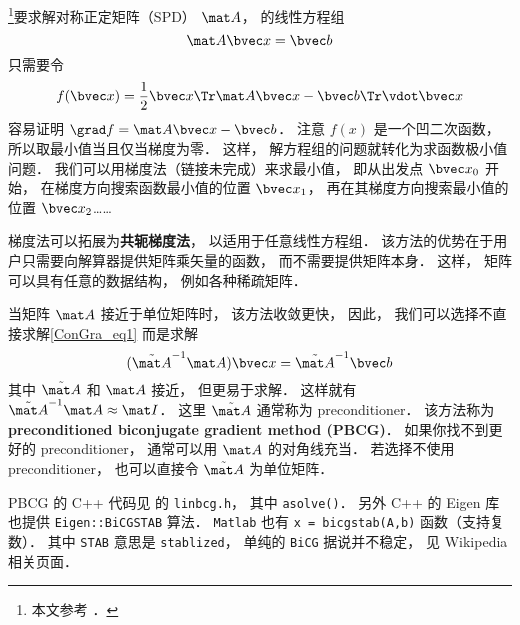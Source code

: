 
\begin{issues}
\issueDraft
\end{issues}


\footnote{本文参考 \cite{NR3}．}要求解对称正定矩阵（SPD） $\mat A$， 的线性方程组
\begin{equation}\label{ConGra_eq1}
\mat A \bvec x = \bvec b
\end{equation}
只需要令
\begin{equation}
f(\bvec x) = \frac{1}{2}\bvec x\Tr \mat A\bvec x - \bvec b\Tr \vdot \bvec x
\end{equation}
容易证明 $\grad f = \mat A \bvec x - \bvec b$． 注意 $f(x)$ 是一个凹二次函数， 所以取最小值当且仅当梯度为零． 这样， 解方程组的问题就转化为求函数极小值问题． 我们可以用梯度法（链接未完成）来求最小值， 即从出发点 $\bvec x_0$ 开始， 在梯度方向搜索函数最小值的位置 $\bvec x_1$， 再在其梯度方向搜索最小值的位置 $\bvec x_2$……

梯度法可以拓展为\textbf{共轭梯度法}， 以适用于任意线性方程组． 该方法的优势在于用户只需要向解算器提供矩阵乘矢量的函数， 而不需要提供矩阵本身． 这样， 矩阵可以具有任意的数据结构， 例如各种稀疏矩阵．

当矩阵 $\mat A$ 接近于单位矩阵时， 该方法收敛更快， 因此， 我们可以选择不直接求解\autoref{ConGra_eq1} 而是求解
\begin{equation}
(\tilde {\mat A}^{-1}\mat A) \bvec x = \tilde {\mat A}^{-1}\bvec b
\end{equation}
其中 $\tilde {\mat A}$ 和 $\mat A$ 接近， 但更易于求解． 这样就有 $\tilde {\mat A}^{-1}\mat A \approx \mat I$． 这里 $\tilde {\mat A}$ 通常称为 preconditioner． 该方法称为 \textbf{preconditioned biconjugate gradient method (PBCG)}． 如果你找不到更好的 preconditioner， 通常可以用 $\mat A$ 的对角线充当． 若选择不使用 preconditioner， 也可以直接令 $\tilde {\mat A}$ 为单位矩阵．

PBCG 的 C++ 代码见 \cite{NR3} 的 \verb|linbcg.h|， 其中 \verb|asolve()|． 另外 C++ 的 Eigen 库也提供 \verb|Eigen::BiCGSTAB| 算法． \verb|Matlab| 也有 \verb|x = bicgstab(A,b)| 函数（支持复数）． 其中 \verb|STAB| 意思是 \verb|stablized|， 单纯的 \verb|BiCG| 据说并不稳定， 见 Wikipedia 相关页面．
